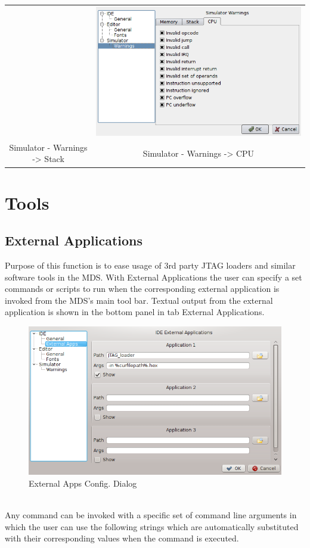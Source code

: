 \begin{table}[h!]
\begin{tabular}{cc}
                    &
                \includegraphics[width=.4\textwidth]{img/interface6.png}
                    \\
                Simulator - Warnings -> Stack & Simulator - Warnings -> CPU
            \end{tabular}
        \end{table}

\clearpage
\section{Tools}
    \subsection{External Applications}
        Purpose of this function is to ease usage of 3rd party JTAG loaders and similar software tools in the MDS. With External Applications the user can specify a set commands or scripts to run when the corresponding external application is invoked from the MDS's main tool bar. Textual output from the external application is shown in the bottom panel in tab External Applications.

        \begin{figure}[h]
            \centering
            \includegraphics[width=.6\textwidth]{img/externalApps.png}
            \caption{External Apps Config. Dialog}
        \end{figure}

        ~\\Any command can be invoked with a specific set of command line arguments in which the user can use the following strings which are automatically substituted with their corresponding values when the command is executed.

